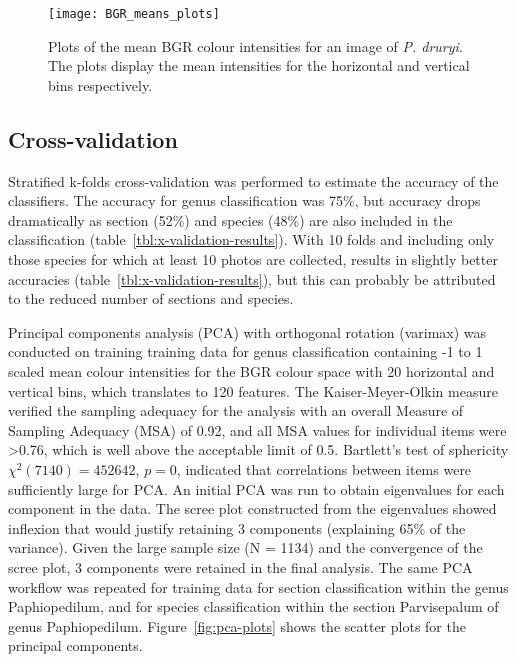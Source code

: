 \documentclass[review,3p,twocolumn]{elsarticle}
\begin{document}
\begin{figure*}[t]
    \centering
    \texttt{[image: BGR\_means\_plots]}
    \caption{Plots of the mean BGR colour intensities for an image of \textit{P. druryi}. The plots display the mean intensities for the horizontal and vertical bins respectively.}
    \label{fig:bgr-means-plots}
\end{figure*}

\subsection{Cross-validation}

Stratified k-folds cross-validation was performed to estimate the accuracy of the classifiers. The accuracy for genus classification was 75\%, but accuracy drops dramatically as section (52\%) and species (48\%) are also included in the classification (table~\ref{tbl:x-validation-results}). With 10 folds and including only those species for which at least 10 photos are collected, results in slightly better accuracies (table~\ref{tbl:x-validation-results}), but this can probably be attributed to the reduced number of sections and species.

Principal components analysis (PCA) with orthogonal rotation (varimax) was conducted on training training data for genus classification containing -1 to 1 scaled mean colour intensities for the BGR colour space with 20 horizontal and vertical bins, which translates to 120 features. The Kaiser-Meyer-Olkin measure verified the sampling adequacy for the analysis with an overall Measure of Sampling Adequacy (MSA) of 0.92, and all MSA values for individual items were >0.76, which is well above the acceptable limit of 0.5. Bartlett's test of sphericity $\chi^2 (7140) = 452642$, $p = 0$, indicated that correlations between items were sufficiently large for PCA. An initial PCA was run to obtain eigenvalues for each component in the data. The scree plot constructed from the eigenvalues showed inflexion that would justify retaining 3 components (explaining 65\% of the variance). Given the large sample size (N = 1134) and the convergence of the scree plot, 3 components were retained in the final analysis. The same PCA workflow was repeated for training data for section classification within the genus Paphiopedilum, and for species classification within the section Parvisepalum of genus Paphiopedilum. Figure~\ref{fig:pca-plots} shows the scatter plots for the principal components.
\end{document}
